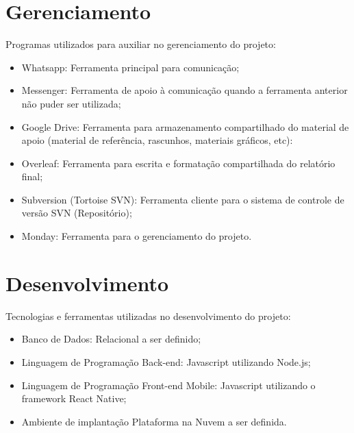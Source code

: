\documentclass[
    12pt,               %
    openright,          %
    oneside,
    a4paper,            %
    draft,              %
    MODELO,             %
    TODO,               %
    english,            %
    brazil              %
    ]{ifsp-spo-inf-ctds}
\begin{document}
\section{Gerenciamento}
Programas utilizados para auxiliar no gerenciamento do projeto:

\begin{itemize}
\item Whatsapp: Ferramenta principal para comunicação;
\item Messenger: Ferramenta de apoio à comunicação quando a ferramenta anterior não puder ser utilizada;
\item Google Drive: Ferramenta para armazenamento compartilhado do material de apoio (material de referência, rascunhos, materiais gráficos, etc): 
\item Overleaf: Ferramenta para escrita e formatação compartilhada do relatório final;
\item Subversion (Tortoise SVN): Ferramenta cliente para o sistema de controle de versão SVN (Repositório);
\item Monday: Ferramenta para o gerenciamento do projeto.
\end{itemize}

\section{Desenvolvimento}
Tecnologias e ferramentas utilizadas no desenvolvimento do projeto:

\begin{itemize}
\item Banco de Dados: Relacional a ser definido;
\item Linguagem de Programação Back-end: Javascript utilizando Node.js;
\item Linguagem de Programação Front-end Mobile: Javascript utilizando o framework React Native;
\item Ambiente de implantação Plataforma na Nuvem a ser definida.
\end{itemize}


\end{document}
